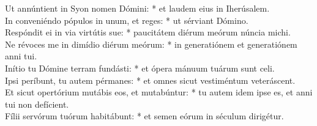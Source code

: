 {	Ut annúntient in Syon nomen Dómini: * et laudem eius in Iherúsalem. \\
	In conveniéndo pópulos in unum, et reges: * ut sérviant Dómino. \\
	Respóndit ei in via virtútis sue: * paucitátem diérum meórum núncia michi. \\
	Ne révoces me in dimídio diérum meórum: * in generatiónem et generatiónem anni tui. \\
	Inítio tu Dómine terram fundásti: * et ópera mánuum tuárum sunt celi. \\
	Ipsi períbunt, tu autem pérmanes: * et omnes sicut vestiméntum veteráscent. \\
	Et sicut opertórium mutábis eos, et mutabúntur: * tu autem idem ipse es, et anni tui non defícient. \\
	Fílii servórum tuórum habitábunt: * et semen eórum in séculum dirigétur.
}

